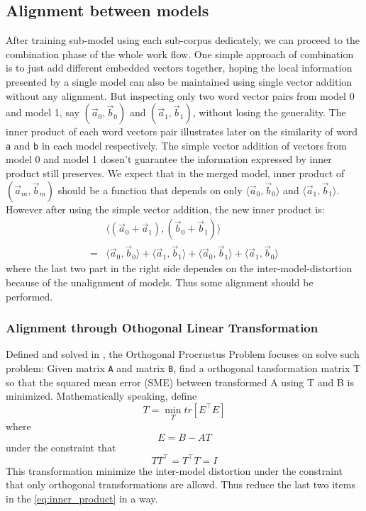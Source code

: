 \documentclass[11pt,a4paper]{article}
\begin{document}
  \subsection{Alignment between models}
  After training sub-model using each sub-corpus dedicately, we can proceed to the combination phase of the whole work flow. One simple approach of combination is to just add different embedded vectors together, hoping the local information presented by a single model can also be maintained using single vector addition without any alignment. But inspecting only two word vector pairs from model 0 and model 1, say $(\vec{a}_0, \vec{b}_0)$ and $(\vec{a}_1, \vec{b}_1)$, without losing the generality. The inner product of each word vectors pair illustrates later on the similarity of word \verb|a| and \verb|b| in each model respectively. The simple vector addition of vectors from model 0 and model 1 dosen't guarantee the information expressed by inner product still preserves. We expect that in the merged model, inner product of $(\vec{a}_m,\vec{b}_m)$ should be a function that depends on only $\langle\vec{a}_0,\vec{b}_0\rangle$ and $\langle\vec{a}_1, \vec{b}_1\rangle$. However after using the simple vector addition, the new inner product is:
  \begin{equation}\label{eq:inner_product}
  \begin{split}
  &\langle(\vec{a}_0+\vec{a}_1), (\vec{b}_0+\vec{b}_1)\rangle\\
  = &\langle\vec{a}_0,\vec{b}_0\rangle+
    \langle\vec{a}_1,\vec{b}_1\rangle+
    \langle\vec{a}_0,\vec{b}_1\rangle+
    \langle\vec{a}_1,\vec{b}_0\rangle
  \end{split}
  \end{equation}
  where the last two part in the right side dependes on the inter-model-distortion because of the unalignment of models. Thus some alignment should be performed.

  \subsubsection{Alignment through Othogonal Linear Transformation}
  Defined and solved in \cite{schonemann1966generalized}, the Orthogonal Procrustus Problem focuses on solve such problem: Given matrix \verb|A| and matrix \verb|B|, find a orthogonal tansformation matrix T so that the squared mean error (SME) between transformed A using T and B is minimized. Mathematically speaking, define
  \begin{equation}
  T = \min_{T}tr[E^\intercal E]
  \end{equation}
  where 
  \begin{equation}
  E=B-AT
  \end{equation}
  under the constraint that 
  \begin{equation}
  TT^\intercal=T^\intercal T=I
  \end{equation}
  This transformation minimize the inter-model distortion under the constraint that only orthogonal transformations are allowd. Thus reduce the last two items in the \eqref{eq:inner_product} in a way.
\end{document}
